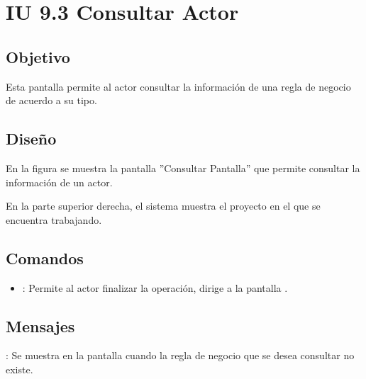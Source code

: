 \section{IU 9.3 Consultar Actor}

\subsection{Objetivo}
	Esta pantalla permite al actor consultar la información de una regla de negocio de acuerdo a su tipo.
\subsection{Diseño}
	En la figura  se muestra la pantalla ''Consultar Pantalla'' que permite consultar la información de un actor.
	
	En la parte superior derecha, el sistema muestra el proyecto en el que se encuentra trabajando.

\subsection{Comandos}
\begin{itemize}
	\item {}: Permite al actor finalizar la operación, dirige a la pantalla .
\end{itemize}

\subsection{Mensajes}

\begin{Citemize}
	\item {}: Se muestra en la pantalla  cuando la regla de negocio que se desea consultar no existe.
\end{Citemize}
